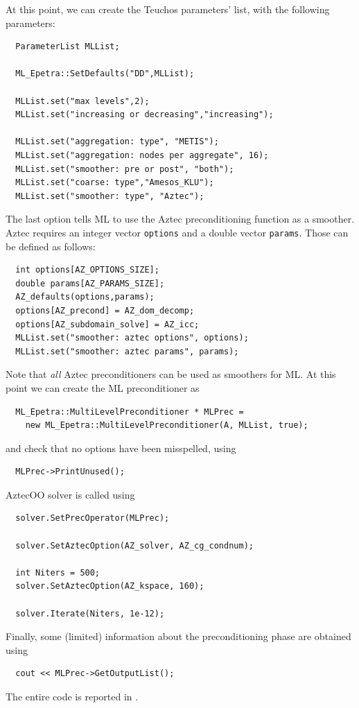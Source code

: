 At this point, we can create the Teuchos parameters' list, with the
following parameters:
\begin{verbatim}
  ParameterList MLList;

  ML_Epetra::SetDefaults("DD",MLList);

  MLList.set("max levels",2);
  MLList.set("increasing or decreasing","increasing");

  MLList.set("aggregation: type", "METIS");
  MLList.set("aggregation: nodes per aggregate", 16);
  MLList.set("smoother: pre or post", "both");
  MLList.set("coarse: type","Amesos_KLU");
  MLList.set("smoother: type", "Aztec");
\end{verbatim}
The last option tells ML to use the Aztec preconditioning function as a
smoother. Aztec requires an integer vector \verb!options! and a double
vector \verb!params!. Those can be defined as follows:
\begin{verbatim}
  int options[AZ_OPTIONS_SIZE];
  double params[AZ_PARAMS_SIZE];
  AZ_defaults(options,params);
  options[AZ_precond] = AZ_dom_decomp;
  options[AZ_subdomain_solve] = AZ_icc;
  MLList.set("smoother: aztec options", options);
  MLList.set("smoother: aztec params", params);
\end{verbatim}
Note that {\sl all} Aztec preconditioners can be used as smoothers for
ML. 
At this point we can create the ML preconditioner as
\begin{verbatim}
  ML_Epetra::MultiLevelPreconditioner * MLPrec =
    new ML_Epetra::MultiLevelPreconditioner(A, MLList, true);
\end{verbatim}
and check that no options have been misspelled, using
\begin{verbatim}
  MLPrec->PrintUnused();
\end{verbatim}
AztecOO solver is called using
\begin{verbatim}
  solver.SetPrecOperator(MLPrec);

  solver.SetAztecOption(AZ_solver, AZ_cg_condnum);

  int Niters = 500;
  solver.SetAztecOption(AZ_kspace, 160);

  solver.Iterate(Niters, 1e-12);
\end{verbatim}
Finally, some (limited) information about the preconditioning phase are
obtained using
\begin{verbatim}
  cout << MLPrec->GetOutputList();
\end{verbatim}
The entire code is reported in 
\newline
{}.
\newline
